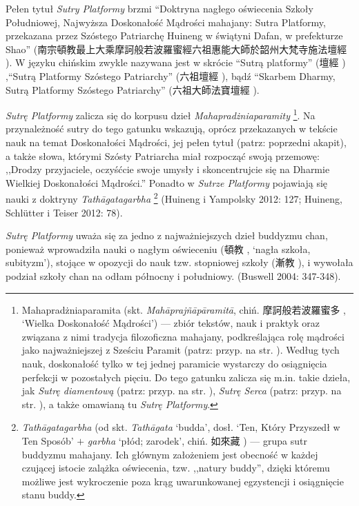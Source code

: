 Pełen tytuł \textit{Sutry Platformy} brzmi ``Doktryna nagłego oświecenia Szkoły Południowej, Najwyższa Doskonałość Mądrości mahajany: Sutra Platformy, przekazana przez Szóstego Patriarchę Huineng w świątyni Dafan, w prefekturze Shao'' (南宗頓教最上大乘摩訶般若波羅蜜經六祖惠能大師於韶州大梵寺施法壇經 ).
W języku chińskim zwykle nazywana jest w skrócie ``Sutrą platformy'' (壇經 ) ,``Sutrą Platformy Szóstego Patriarchy'' (六祖壇經 ), bądź ``Skarbem Dharmy, Sutrą Platformy Szóstego Patriarchy'' (六祖大師法寶壇經 ).

\textit{Sutrę Platformy} zalicza się do korpusu dzieł \textit{Mahapradżniaparamity}%
\footnote{Mahapradżniaparamita (skt. \textit{Mahāprajñāpāramitā}, chiń. 摩訶般若波羅蜜多 , `Wielka Doskonałość Mądrości') --- zbiór tekstów, nauk i praktyk oraz związana z nimi tradycja filozoficzna mahajany, podkreślająca rolę mądrości jako najważniejszej z Sześciu Paramit (patrz: przyp. na str. \pageref{Paramitas}).
Według tych nauk, doskonałość tylko w tej jednej paramicie wystarczy do osiągnięcia perfekcji w pozostałych pięciu. Do tego gatunku zalicza się m.in. takie dzieła, jak \textit{Sutrę diamentową} (patrz: przyp. na str. \pageref{DiamondSutra}), \textit{Sutrę Serca} (patrz: przyp. na str. \pageref{HeartSutra}), a także omawianą tu \textit{Sutrę Platformy}.}.
Na przynależność sutry do tego gatunku wskazują, oprócz przekazanych w tekście nauk na temat Doskonałości Mądrości, jej pełen tytuł (patrz: poprzedni akapit), a także słowa, którymi Szósty Patriarcha miał rozpocząć swoją przemowę: ,,Drodzy przyjaciele, oczyśćcie swoje umysły i skoncentrujcie się na Dharmie Wielkiej Doskonałości Mądrości.''
Ponadto w \textit{Sutrze Platformy} pojawiają się nauki z doktryny \textit{Tathāgatagarbha}%
\footnote{\textit{Tathāgatagarbha} (od skt. \textit{Tathāgata} `budda', dosł. `Ten, Który Przyszedł w Ten Sposób' $+$ \textit{garbha} `płód; zarodek', chiń. 如來藏 ) --- grupa sutr buddyzmu mahajany.
Ich głównym założeniem jest obecność w każdej czującej istocie zalążka oświecenia, tzw. ,,natury buddy'', dzięki któremu możliwe jest wykroczenie poza krąg uwarunkowanej egzystencji i osiągnięcie stanu buddy.} %
(Huineng i Yampolsky 2012: 127; Huineng, Schlütter i Teiser 2012: 78).

\textit{Sutrę Platformy} uważa się za jedno z najważniejszych dzieł buddyzmu chan, ponieważ wprowadziła nauki o nagłym oświeceniu (頓教 , `nagła szkoła, subityzm'), stojące w opozycji do nauk tzw. stopniowej szkoły (漸教 ), i wywołała podział szkoły chan na odłam północny i południowy. %
(Buswell 2004: 347-348).%

